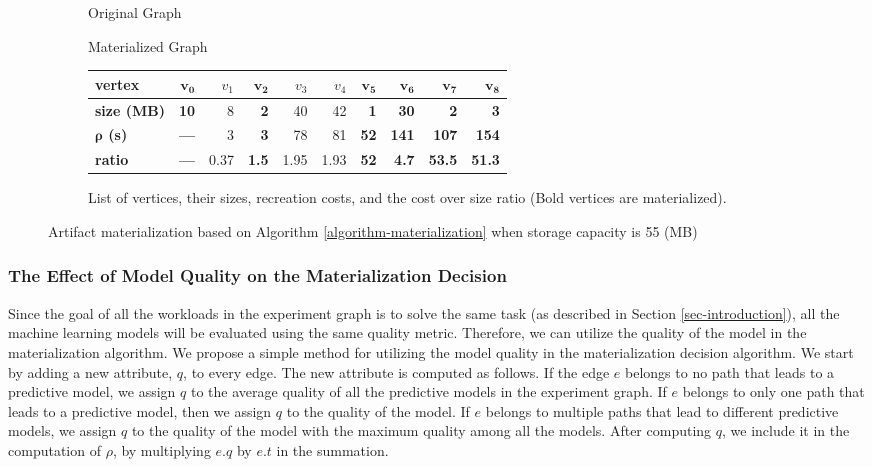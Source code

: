 \begin{figure}
\begin{subfigure}{0.5\linewidth}
\centering

\caption{Original Graph}
\end{subfigure}%
\begin{subfigure}{0.5\linewidth}
\centering

\caption{Materialized Graph}
\end{subfigure}
\begin{subfigure}{\linewidth}
\setlength\tabcolsep{3.5pt} %
\begin{tabular}{l | | >{\bfseries}r | r  |>{\bfseries}r | r | r | >{\bfseries}r | >{\bfseries}r | >{\bfseries}r |>{\bfseries}r }
\hline
\textbf{vertex} & $\boldsymbol{v_0}$ & $v_1$ & $\boldsymbol{v_2}$ & $v_3$ & $v_4$ & $\boldsymbol{v_5}$ & $\boldsymbol{v_6}$ & $\boldsymbol{v_7}$ &$\boldsymbol{v_8}$ \\
\hline
\textbf{size (MB)}    & 10 & 8 & 2 & 40 & 42 & 1 & 30 & 2   & 3        \\
\textbf{$\boldsymbol{\rho}$ (s)} & ---   & 3 & 3 & 78 & 81 & 52 & 141 & 107 & 154	  \\
\textbf{ratio}& ---   & 0.37 & 1.5 & 1.95 & 1.93 & 52 & 4.7 & 53.5 & 51.3	\\
\hline
\end{tabular}
\caption{List of vertices, their sizes, recreation costs, and the cost over size ratio (Bold vertices are materialized).}
\end{subfigure}
\caption{Artifact materialization based on Algorithm \ref{algorithm-materialization} when storage capacity is 55 (MB)}
\label{fig-materialization-example}
\end{figure}

\subsubsection{The Effect of Model Quality on the Materialization Decision}
Since the goal of all the workloads in the experiment graph is to solve the same task (as described in Section \ref{sec-introduction}), all the machine learning models will be evaluated using the same quality metric.
Therefore, we can utilize the quality of the model in the materialization algorithm.
We propose a simple method for utilizing the model quality in the materialization decision algorithm.
We start by adding a new attribute, $q$, to every edge.
The new attribute is computed as follows.
If the edge $e$ belongs to no path that leads to a predictive model, we assign $q$ to the average quality of all the predictive models in the experiment graph.
If $e$ belongs to only one path that leads to a predictive model, then we assign $q$ to the quality of the model.
If $e$ belongs to multiple paths that lead to different predictive models, we assign $q$ to the quality of the model with the maximum quality among all the models.
After computing $q$, we include it in the computation of $\rho$, by multiplying $e.q$ by $e.t$ in the summation. 

